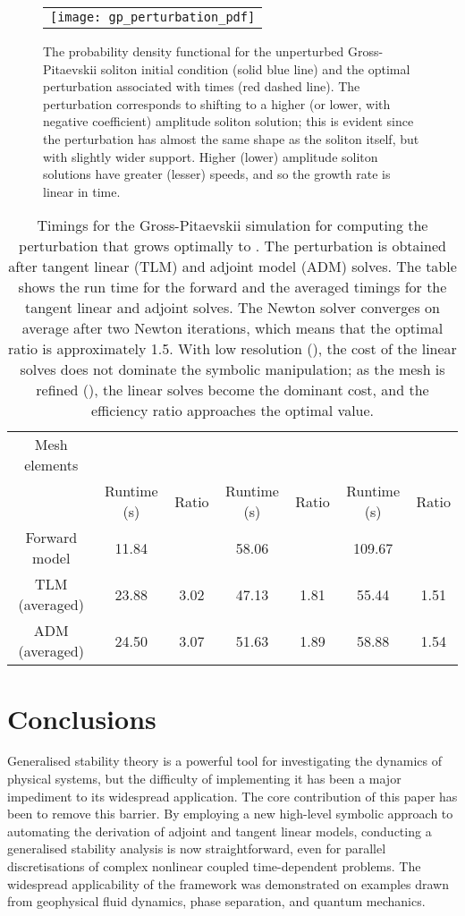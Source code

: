 \documentclass{siamltex}
\begin{document}
\begin{figure}
  \centering
  \begin{tabular}{c}
    \texttt{[image: gp\_perturbation\_pdf]}
  \end{tabular}
  \caption{The probability density functional for the unperturbed
    Gross-Pitaevskii soliton initial condition (solid blue line) and
    the optimal perturbation associated with times  (red
    dashed line). The perturbation corresponds to shifting to a higher
    (or lower, with negative coefficient) amplitude soliton solution;
    this is evident since the perturbation has almost the same shape
    as the soliton itself, but with slightly wider support. Higher
    (lower) amplitude soliton solutions have greater (lesser) speeds,
    and so the growth rate is linear in time.}
  \label{fig:gp_pdfs}
\end{figure}
\begin{table}[t]
\centering
\begin{tabular}{c|cc|cc|cc}
\toprule
Mesh elements & \multicolumn{2}{|c|}{} & \multicolumn{2}{|c}{} & \multicolumn{2}{|c}{} \\ & Runtime (s) & Ratio  & Runtime (s) & Ratio & Runtime (s) & Ratio \\ 
\midrule
Forward model & 11.84 &  & 58.06 & & 109.67  \\ 
TLM (averaged) & 23.88 & 3.02 & 47.13 & 1.81 & 55.44 & 1.51 \\ 
      ADM (averaged) & 24.50 & 3.07 & 51.63 & 1.89 & 58.88 & 1.54 \\ 
\bottomrule
\end{tabular}
\caption{Timings for the Gross-Pitaevskii simulation for computing the perturbation that grows optimally to . 
  The perturbation is obtained after  tangent linear (TLM) and adjoint model (ADM) solves. 
 The table shows the run time for the forward and the averaged timings for the tangent linear and adjoint solves.
 The Newton solver converges on average after two Newton iterations, which means that the optimal ratio is approximately 1.5.
 With low resolution (), the cost of the linear solves does not dominate the symbolic
 manipulation; as the mesh is refined (), the linear solves become the
 dominant cost, and the efficiency ratio approaches the optimal value.
} 
\label{tab:gross-pitaevskii-timings}
\end{table}

\section{Conclusions}
Generalised stability theory is a powerful tool for investigating the dynamics of physical systems, but the
difficulty of implementing it has been a major impediment to its widespread application. The core contribution
of this paper has been to remove this barrier. By employing a new high-level symbolic approach to automating
the derivation of adjoint and tangent linear models, conducting a generalised stability analysis is now
straightforward, even for parallel discretisations of complex nonlinear coupled time-dependent problems. The widespread
applicability of the framework was demonstrated on examples drawn from geophysical fluid dynamics, phase
separation, and quantum mechanics.
\end{document}
